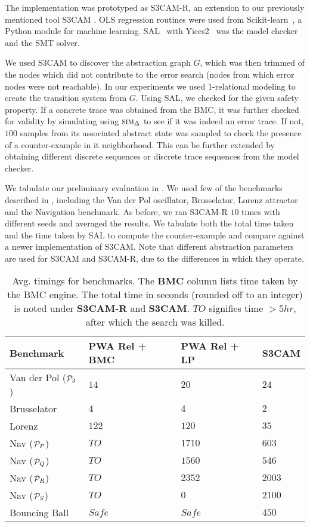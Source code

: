 
The implementation was prototyped as S3CAM-R, an extension to our
previously mentioned tool S3CAM \cite{zutshi2014multiple}. OLS regression
routines were used from Scikit-learn~\cite{pedregosa2011scikit}, a
Python module for machine learning. SAL~\cite{SAL-SRI}
with Yices2~\cite{dutertre2014yices} was the model checker and the SMT
solver.

We used S3CAM to discover the abstraction graph $G$, which was then
trimmed of the nodes which did not contribute to the error search
(nodes from which error nodes were not reachable). In our experiments we
used $1$-relational modeling to create the transition system from $G$.
Using SAL, we checked for the given safety property. If a concrete
trace was obtained from the BMC, it was further checked for validity
by simulating using $\mbox{\sc sim}_\Delta$ to see if it was indeed an error
trace.  If not, $100$ samples from its associated abstract state was
sampled to check the presence of a counter-example in it
neighborhood. This can be further extended by obtaining different
discrete sequences or discrete trace sequences from the model checker.

We tabulate our preliminary evaluation in . We used
few of the benchmarks described in \cite{zutshi2014multiple}, including the Van
der Pol oscillator, Brusselator, Lorenz attractor and the Navigation
benchmark. As before, we ran S3CAM-R $10$ times with different seeds
and averaged the results. We tabulate both the total time taken and
the time taken by SAL to compute the counter-example and compare
against a newer implementation of S3CAM. Note that different
abstraction parameters are used for S3CAM and S3CAM-R, due to the
differences in which they operate.

\begin{table}[!htbp]
\centering
\caption{Avg. timings for benchmarks. The \textbf{BMC} column lists
time taken by the BMC engine. The total time in seconds (rounded off
to an integer) is noted under \textbf{S3CAM-R} and \textbf{S3CAM}.
$TO$ signifies time $>5hr$, after which the search was killed.}
\label{tab:res-rel}
\begin{tabular}{@{}llll@{}}
\toprule
    Benchmark & PWA Rel + BMC & PWA Rel + LP & S3CAM\\
\midrule
    Van der Pol ($\mathcal{P}_3$)   &$14$ & $20$ & $24$\\
    Brusselator               &$4$ & $4$ & $2$\\
    Lorenz                    &$122$ & $120$ & $35$\\
    Nav ($\mathcal{P}_P$)           &$TO$ & $1710$  & $603$ \\%
    Nav ($\mathcal{P}_Q$)           &$TO$ & $1560$   & $546$ \\%
    Nav ($\mathcal{P}_R$)           &$TO$ & $2352$  & $2003$\\
    Nav ($\mathcal{P}_S$)           &$TO$ & $0$  & $2100$\\
    Bouncing Ball             &$Safe$ & $Safe$  & $450$\\

\bottomrule
\end{tabular}
\end{table}

